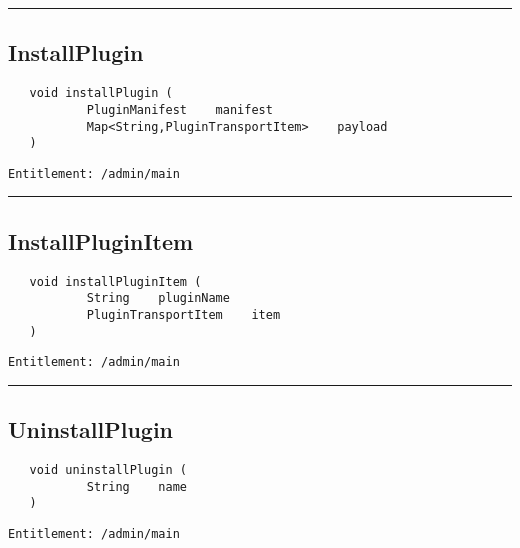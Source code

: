\rule{12cm}{2pt}
\subsection{InstallPlugin}
\label{Api:InstallPlugin}
\begin{verbatim}
   void installPlugin (
           PluginManifest    manifest
           Map<String,PluginTransportItem>    payload
   )
\end{verbatim}
\begin{Verbatim}[fontsize=\small, formatcom=\color{Maroon}]
  Entitlement: /admin/main
\end{Verbatim}



\rule{12cm}{2pt}
\subsection{InstallPluginItem}
\label{Api:InstallPluginItem}
\begin{verbatim}
   void installPluginItem (
           String    pluginName
           PluginTransportItem    item
   )
\end{verbatim}
\begin{Verbatim}[fontsize=\small, formatcom=\color{Maroon}]
  Entitlement: /admin/main
\end{Verbatim}



\rule{12cm}{2pt}
\subsection{UninstallPlugin}
\label{Api:UninstallPlugin}
\begin{verbatim}
   void uninstallPlugin (
           String    name
   )
\end{verbatim}
\begin{Verbatim}[fontsize=\small, formatcom=\color{Maroon}]
  Entitlement: /admin/main
\end{Verbatim}



